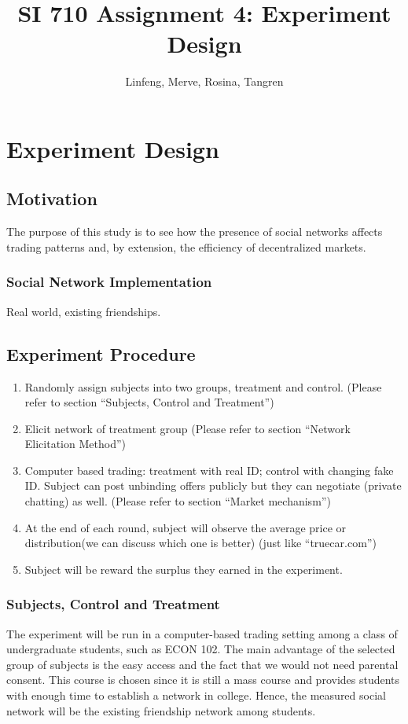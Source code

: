 \documentclass{article}
\title{SI 710 Assignment 4: Experiment Design}
\author{Linfeng, Merve, Rosina, Tangren}
\date{}
\begin{document}
\maketitle
%

\section{Experiment Design}
\subsection{Motivation}
The purpose of this study is to see how the presence of social networks affects
trading patterns and, by extension, the efficiency of decentralized markets.


\subsubsection{Social Network Implementation}
Real world, existing friendships.

\subsection{Experiment Procedure}
\begin{enumerate}
    \item Randomly assign subjects into two groups, treatment and control.
        (Please refer to section ``Subjects, Control and Treatment'')
    \item Elicit network of treatment group (Please refer to section ``Network
        Elicitation Method'')
    \item Computer based trading: treatment with real ID; control with changing
        fake ID. Subject can post unbinding offers publicly but they can
        negotiate (private chatting) as well. (Please refer to section ``Market
        mechanism'')
    \item At the end of each round, subject will observe the average price or
        distribution(we can discuss which one is better) (just like
        ``truecar.com'')
    \item Subject will be reward the surplus they earned in the experiment.
\end{enumerate}

\subsubsection{Subjects, Control and Treatment}
The experiment will be run in a computer-based trading setting among a class of
undergraduate students, such as ECON 102. The main advantage of the selected
group of subjects is the easy access and the fact that we would not need
parental consent. This course is chosen since it is still a mass course and
provides students with enough time to establish a network in college. Hence, the
measured social network will be the existing friendship network among students.
\end{document}
